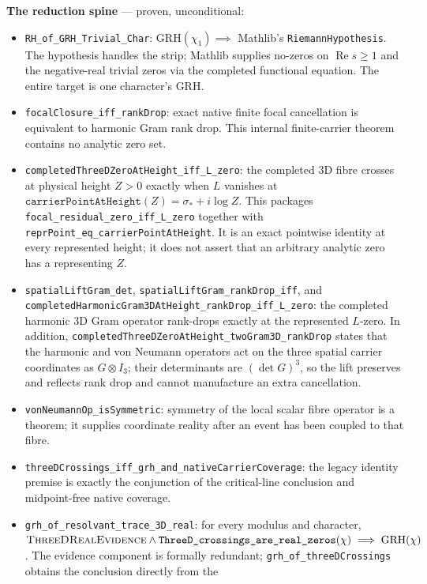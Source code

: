 \documentclass[11pt]{article}
\theoremstyle{definition}
\renewcommand{\Re}{\operatorname{Re}}
\begin{document}
\medskip
\noindent\textbf{The reduction spine} --- proven, unconditional:
\begin{itemize}
\item \texttt{RH\_of\_GRH\_Trivial\_Char}: \(\mathrm{GRH}(\chi_1)\implies\)
Mathlib's \texttt{RiemannHypothesis}. The hypothesis handles the strip;
Mathlib supplies no-zeros on \(\Re s\ge1\) and the negative-real trivial
zeros via the completed functional equation. The entire target is one
character's GRH.
\item \texttt{focalClosure\_iff\_rankDrop}: exact native finite focal
cancellation is equivalent to harmonic Gram rank drop.  This internal
finite-carrier theorem contains no analytic zero set.
\item \texttt{completedThreeDZeroAtHeight\_iff\_L\_zero}: the completed
3D fibre crosses at physical height \(Z>0\) exactly when \(L\) vanishes at
\(\texttt{carrierPointAtHeight}(Z)=\sigma_*+i\log Z\).  This packages
\texttt{focal\_residual\_zero\_iff\_L\_zero} together with
\texttt{reprPoint\_eq\_carrierPointAtHeight}.  It is an exact pointwise
identity at every represented height; it does not assert that an arbitrary
analytic zero has a representing \(Z\).
\item \texttt{spatialLiftGram\_det},
\texttt{spatialLiftGram\_rankDrop\_iff}, and
\texttt{completedHarmonicGram3DAtHeight\allowbreak\_rankDrop\allowbreak\_iff\allowbreak\_L\allowbreak\_zero}: the
completed harmonic 3D Gram operator rank-drops exactly at the represented
\(L\)-zero.  In addition,
\texttt{completedThreeDZeroAtHeight\_twoGram3D\_rankDrop} states that the harmonic and
von Neumann operators act on the three spatial carrier coordinates as
\(G\otimes I_3\); their determinants are \((\det G)^3\), so the lift
preserves and reflects rank drop and cannot manufacture an extra
cancellation.
\item \texttt{vonNeumannOp\_isSymmetric}: symmetry of the local scalar fibre
operator is a theorem; it supplies coordinate reality after an event has
been coupled to that fibre.
\item \texttt{threeDCrossings\_iff\_grh\_and\_nativeCarrierCoverage}: the
legacy identity premise is exactly the conjunction of the critical-line
conclusion and midpoint-free native coverage.
\item \texttt{grh\_of\_resolvant\_trace\_3D\_real}: for every modulus and
character, \(\textsc{ThreeDRealEvidence}\wedge
\texttt{ThreeD\_crossings\_are\_real\_zeros}(\chi)\implies
\mathrm{GRH}(\chi)\). The evidence component is formally redundant;
\texttt{grh\_of\_threeDCrossings} obtains the conclusion directly from the

\end{itemize}
\end{document}
